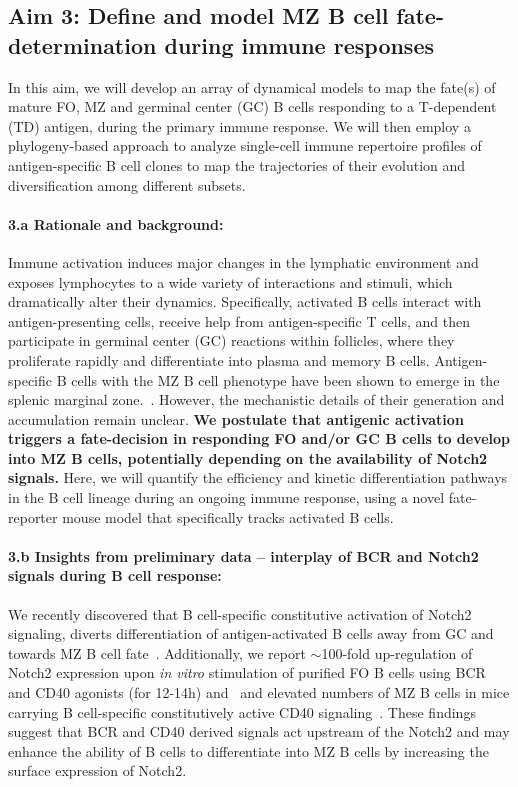 \documentclass[11pt]{article}
\newcommand{\para}[1]{\vspace*{-4.5mm}\paragraph{#1}}
\begin{document}
\subsection*{Aim 3: Define and model MZ B cell fate-determination during immune responses}
\vspace*{-1mm}
In this aim, we will develop an array of dynamical models to map the fate(s) of mature FO, MZ and germinal center (GC) B cells responding to a T-dependent (TD) antigen, during the primary immune response.
We will then employ a phylogeny-based approach to analyze single-cell immune repertoire profiles of antigen-specific B cell clones to map the trajectories of their evolution and diversification among different subsets. 


\para{{3.a Rationale and background:}}
Immune activation induces major changes in the lymphatic environment and exposes lymphocytes to a wide variety of interactions and stimuli, which dramatically alter their dynamics. 
Specifically, activated B cells interact with antigen-presenting cells, receive help from antigen-specific T cells, and then participate in germinal center (GC) reactions within follicles, where they proliferate rapidly and differentiate into plasma and memory B cells. 
Antigen-specific B cells with the MZ B cell phenotype have been shown to emerge in the splenic marginal zone.~\cite{Liu_1988, Yang_Shih_2002}.
However, the mechanistic details of their generation and accumulation remain unclear.
\textbf{We postulate that antigenic activation triggers a fate-decision in responding FO and/or GC B cells to develop into MZ B cells, potentially depending on the availability of Notch2 signals. }
Here, we will quantify the efficiency and kinetic differentiation pathways in the B cell lineage during an ongoing immune response, using a novel fate-reporter mouse model that specifically tracks activated B cells.


\para{{3.b Insights from preliminary data -- interplay of BCR and Notch2 signals during B cell response:}}
We recently discovered that B cell-specific constitutive activation of Notch2 signaling, diverts differentiation of antigen-activated B cells away from GC and towards MZ B cell fate~\cite{Babushku:2022}.
Additionally, we report $\sim$100-fold up-regulation of Notch2 expression upon \textit{in vitro} stimulation of purified FO B cells using BCR and CD40 agonists (for 12-14h)  and~\cite{Babushku:2022} and elevated numbers of MZ B cells in mice carrying B cell-specific constitutively active CD40 signaling~\cite{Homig_Holzel_2008}.
These findings suggest that {BCR and CD40 derived signals act upstream of the Notch2} and may enhance the ability of B cells to differentiate into MZ B cells by increasing the surface expression of Notch2.
\end{document}
